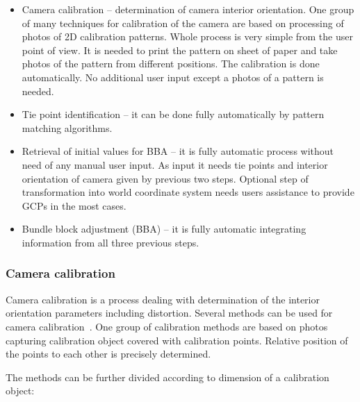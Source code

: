 \documentclass[a4paper,12pt]{article}
\begin{document}
\begin{itemize}
\item Camera calibration -- determination of camera interior orientation.  One group of many techniques for calibration
of the camera are based on processing of photos of 2D calibration patterns. Whole process is very simple from the user point of view. It is needed 
to print the pattern on sheet of paper and take photos of the pattern from different positions. The calibration 
is done automatically. No additional user input except a photos of a pattern is needed.
\item Tie point identification -- it can be done fully automatically by pattern matching algorithms.
\item Retrieval of initial values for BBA -- it is fully automatic process without need of any manual user input.
As input it needs tie points and interior orientation of camera given by previous two steps.
 Optional step of transformation into world coordinate system needs users assistance
 to provide GCPs \cite{heipke1997automation} in the most cases.
\item Bundle block adjustment (BBA) -- it is fully automatic integrating information from all three previous steps.
\end{itemize}
 
\subsubsection{Camera calibration}
\label{sec:cam_calib}


Camera calibration is a process dealing with determination of the interior orientation parameters including distortion.
Several methods can be used for camera calibration~\cite{zhang2004calibration}. 
One group of calibration methods are based on photos capturing calibration object covered with calibration points.
Relative position of the points to each other is  precisely determined.  

The methods can be further divided according to dimension of a calibration object:

\end{document}
